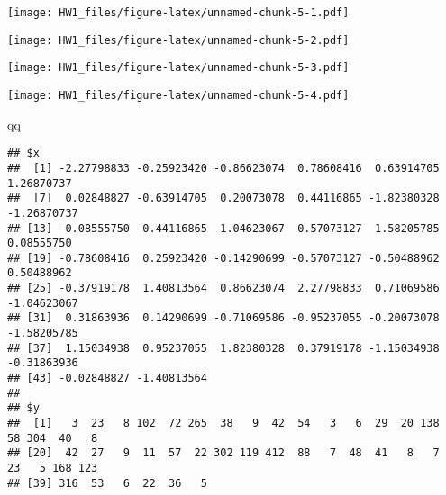 \documentclass[
]{article}
\newenvironment{Shaded}{\begin{snugshade}}{\end{snugshade}}
\newcommand{\DataTypeTok}[1]{\textcolor[rgb]{0.13,0.29,0.53}{#1}}
\newcommand{\KeywordTok}[1]{\textcolor[rgb]{0.13,0.29,0.53}{\textbf{#1}}}
\newcommand{\NormalTok}[1]{#1}
\newcommand{\OperatorTok}[1]{\textcolor[rgb]{0.81,0.36,0.00}{\textbf{#1}}}
\newcommand{\OtherTok}[1]{\textcolor[rgb]{0.56,0.35,0.01}{#1}}
\newcommand{\StringTok}[1]{\textcolor[rgb]{0.31,0.60,0.02}{#1}}
\begin{document}
\texttt{[image: HW1\_files/figure-latex/unnamed-chunk-5-1.pdf]}

\begin{Shaded}
\end{Shaded}

\texttt{[image: HW1\_files/figure-latex/unnamed-chunk-5-2.pdf]}

\begin{Shaded}
\end{Shaded}

\texttt{[image: HW1\_files/figure-latex/unnamed-chunk-5-3.pdf]}

\begin{Shaded}
\end{Shaded}

\texttt{[image: HW1\_files/figure-latex/unnamed-chunk-5-4.pdf]}

\begin{Shaded}
\begin{Highlighting}[]
\NormalTok{qq}
\end{Highlighting}
\end{Shaded}

\begin{verbatim}
## $x
##  [1] -2.27798833 -0.25923420 -0.86623074  0.78608416  0.63914705  1.26870737
##  [7]  0.02848827 -0.63914705  0.20073078  0.44116865 -1.82380328 -1.26870737
## [13] -0.08555750 -0.44116865  1.04623067  0.57073127  1.58205785  0.08555750
## [19] -0.78608416  0.25923420 -0.14290699 -0.57073127 -0.50488962  0.50488962
## [25] -0.37919178  1.40813564  0.86623074  2.27798833  0.71069586 -1.04623067
## [31]  0.31863936  0.14290699 -0.71069586 -0.95237055 -0.20073078 -1.58205785
## [37]  1.15034938  0.95237055  1.82380328  0.37919178 -1.15034938 -0.31863936
## [43] -0.02848827 -1.40813564
## 
## $y
##  [1]   3  23   8 102  72 265  38   9  42  54   3   6  29  20 138  58 304  40   8
## [20]  42  27   9  11  57  22 302 119 412  88   7  48  41   8   7  23   5 168 123
## [39] 316  53   6  22  36   5
\end{verbatim}
\end{document}

